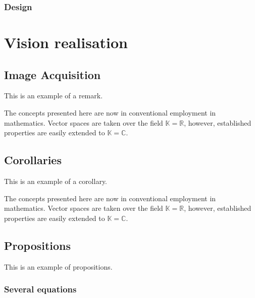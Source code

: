 \documentclass[11pt,fleqn]{book} %
\begin{document}
\subsection{Design}

\chapter{Vision realisation}

\section{Image Acquisition}

This is an example of a remark.

\begin{remark}
The concepts presented here are now in conventional employment in mathematics. Vector spaces are taken over the field $\mathbb{K}=\mathbb{R}$, however, established properties are easily extended to $\mathbb{K}=\mathbb{C}$.
\end{remark}


\section{Corollaries}

This is an example of a corollary.

\begin{corollary}
The concepts presented here are now in conventional employment in mathematics. Vector spaces are taken over the field $\mathbb{K}=\mathbb{R}$, however, established properties are easily extended to $\mathbb{K}=\mathbb{C}$.
\end{corollary}


\section{Propositions}

This is an example of propositions.

\subsection{Several equations}
\end{document}
